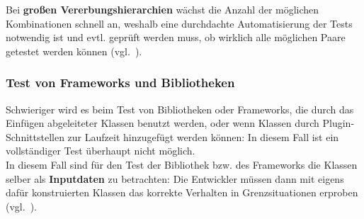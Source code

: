 \noindent
Bei \textbf{großen Vererbungshierarchien} wächst die Anzahl der möglichen Kombinationen schnell an, weshalb eine durchdachte Automatisierung der Tests notwendig ist und evtl. geprüft werden muss, ob wirklich alle möglichen Paare getestet werden können (vgl.~\cite[61]{Wed09c}).

\subsubsection*{Test von Frameworks und Bibliotheken}
Schwieriger wird es beim Test von Bibliotheken oder Frameworks, die durch das Einfügen abgeleiteter Klassen benutzt werden, oder wenn Klassen durch Plugin-Schnittstellen zur Laufzeit hinzugefügt werden können: In diesem Fall ist ein vollständiger Test überhaupt nicht möglich.\\
In diesem Fall sind für den Test der Bibliothek bzw. des Frameworks die Klassen selber als \textbf{Inputdaten} zu betrachten: Die Entwickler müssen dann mit eigens dafür konstruierten Klassen das korrekte Verhalten in Grenzsituationen erproben (vgl.~\cite[62]{Wed09c}).